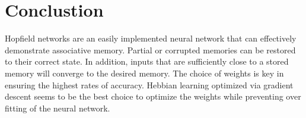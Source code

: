 \section{Conclustion}
Hopfield networks are an easily implemented neural network that can effectively demonstrate associative memory. Partial or corrupted memories can be restored to their correct state. In addition, inputs that are sufficiently close to a stored memory will converge to the desired memory. The choice of weights is key in ensuring the highest rates of accuracy. Hebbian learning optimized via gradient descent seems to be the best choice to optimize the weights while preventing over fitting of the neural network.\newpage